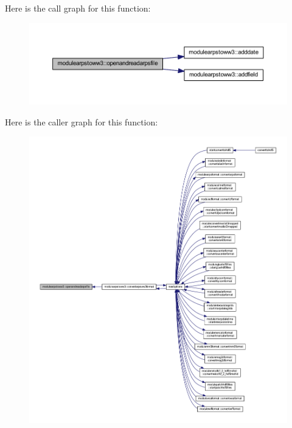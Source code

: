 Here is the call graph for this function\+:\nopagebreak
\begin{figure}[H]
\begin{center}
\leavevmode
\includegraphics[width=350pt]{namespacemodulearpstoww3_aa5a12099f3353b33d3b40f8f3f4384f0_cgraph}
\end{center}
\end{figure}
Here is the caller graph for this function\+:\nopagebreak
\begin{figure}[H]
\begin{center}
\leavevmode
\includegraphics[width=350pt]{namespacemodulearpstoww3_aa5a12099f3353b33d3b40f8f3f4384f0_icgraph}
\end{center}
\end{figure}
\mbox{\label{namespacemodulearpstoww3_a7c18511d187912f655458191bcf1c7af}} 
